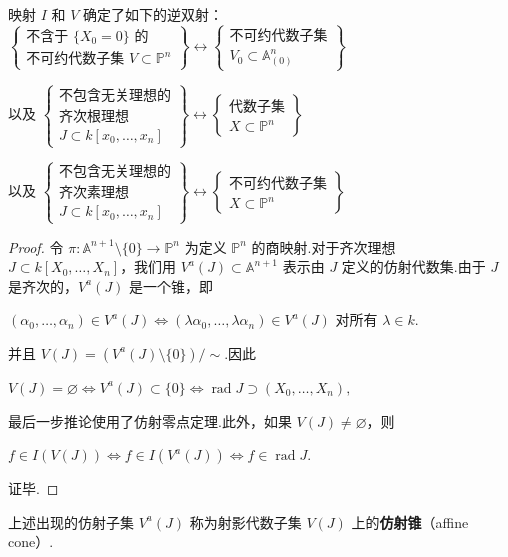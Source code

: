 \begin{corollary}
映射 \(I\) 和 \(V\) 确定了如下的逆双射：
\(
\left\{ \begin{array}{c} \text{不含于 } \{X_0=0\} \text{ 的} \\ \text{不可约代数子集 } V \subset {\mathbb{P}}^n \end{array} \right\} \longleftrightarrow \left\{ \begin{array}{c} \text{不可约代数子集} \\ V_0 \subset {\mathbb{A}}_{(0)}^n \end{array} \right\}
\)

以及
\(
\left\{ \begin{array}{c} \text{不包含无关理想的} \\ \text{齐次根理想} \\ J \subset k[x_0, \ldots, x_n] \end{array} \right\} \longleftrightarrow \left\{ \begin{array}{c} \text{代数子集} \\ X \subset {\mathbb{P}}^n \end{array} \right\}
\)

以及
\(
\left\{ \begin{array}{c} \text{不包含无关理想的} \\ \text{齐次素理想} \\ J \subset k[x_0, \ldots, x_n] \end{array} \right\} \longleftrightarrow \left\{ \begin{array}{c} \text{不可约代数子集} \\ X \subset {\mathbb{P}}^n \end{array} \right\}
\)
\end{corollary}

\begin{proof}
令 \(\pi : {\mathbb{A}}^{n+1} \setminus \{0\} \to {\mathbb{P}}^n\) 为定义 \({\mathbb{P}}^n\) 的商映射.对于齐次理想 \(J \subset k[X_0, \ldots, X_n]\)，我们用 \(V^a(J) \subset {\mathbb{A}}^{n+1}\) 表示由 \(J\) 定义的仿射代数集.由于 \(J\) 是齐次的，\(V^a(J)\) 是一个锥，即

\(
(\alpha_0, \ldots, \alpha_n) \in V^a(J) \Leftrightarrow (\lambda\alpha_0, \ldots, \lambda\alpha_n) \in V^a(J) \text{ 对所有 } \lambda \in k.
\)

并且 \(V(J) = (V^a(J) \setminus \{0\}) / \sim\).因此

\(
V(J) = \varnothing \Leftrightarrow V^a(J) \subset \{0\} \Leftrightarrow \operatorname{rad}J \supset (X_0, \ldots, X_n),
\)

最后一步推论使用了仿射零点定理.此外，如果 \(V(J) \neq \varnothing\)，则

\(
f \in I(V(J)) \Leftrightarrow f \in I(V^a(J)) \Leftrightarrow f \in \operatorname{rad}J.
\)

证毕.
\end{proof}
上述出现的仿射子集 \(V^a(J)\) 称为射影代数子集 \(V(J)\) 上的\textbf{仿射锥}（affine cone）.

